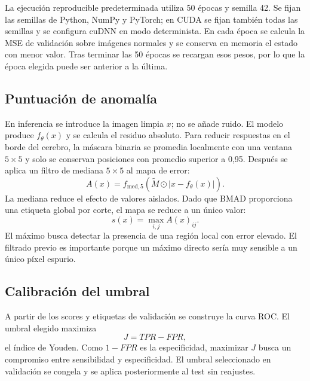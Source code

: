 \documentclass[10pt,a4paper,twocolumn]{article}
\begin{document}
La ejecución reproducible predeterminada utiliza 50 épocas y semilla 42. Se
fijan las semillas de Python, NumPy y PyTorch; en CUDA se fijan también todas las
semillas y se configura cuDNN en modo determinista. En cada época se calcula la
MSE de validación sobre imágenes normales y se conserva en memoria el estado con
menor valor. Tras terminar las 50 épocas se recargan esos pesos, por lo que la
época elegida puede ser anterior a la última.

\subsection{Puntuación de anomalía}
En inferencia se introduce la imagen limpia $x$; no se añade ruido. El modelo
produce $f_\theta(x)$ y se calcula el residuo absoluto. Para reducir respuestas
en el borde del cerebro, la máscara binaria se promedia localmente con una
ventana $5\times5$ y solo se conservan posiciones con promedio superior a
0,95. Después se aplica un filtro de mediana $5\times5$ al mapa de error:
\[
 A(x)=f_{\mathrm{med},5}\left(
  \widetilde M\odot|x-f_\theta(x)|\right).
\]
La mediana reduce el efecto de valores aislados. Dado que BMAD proporciona una
etiqueta global por corte, el mapa se reduce a un único valor:
\[
 s(x)=\max_{i,j} A(x)_{ij}.
\]
El máximo busca detectar la presencia de una región local con error elevado. El
filtrado previo es importante porque un máximo directo sería muy sensible a un
único píxel espurio.

\subsection{Calibración del umbral}
A partir de los scores y etiquetas de validación se construye la curva ROC. El
umbral elegido maximiza
\[
 J=TPR-FPR,
\]
el índice de Youden. Como $1-FPR$ es la especificidad, maximizar $J$ busca un
compromiso entre sensibilidad y especificidad. El umbral seleccionado en
validación se congela y se aplica posteriormente al test sin reajustes.
\end{document}
